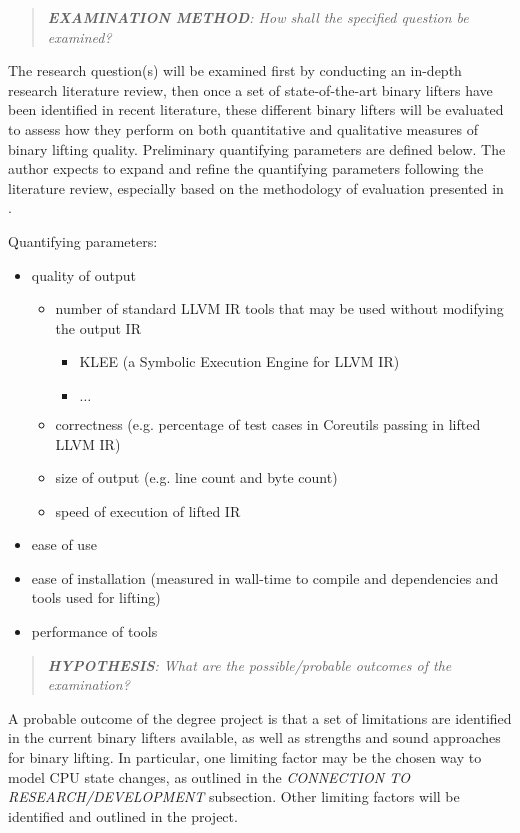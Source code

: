 \documentclass[12pt, a4paper]{article}
\begin{document}

\begin{quote}
	\textit{\textbf{EXAMINATION METHOD}: How shall the specified question be examined?}
\end{quote}

The research question(s) will be examined first by conducting an in-depth research literature review, then once a set of state-of-the-art binary lifters have been identified in recent literature, these different binary lifters will be evaluated to assess how they perform on both quantitative and qualitative measures of binary lifting quality. Preliminary quantifying parameters are defined below. The author expects to expand and refine the quantifying parameters following the literature review, especially based on the methodology of evaluation presented in \cite{evaluation_of_irs}.

Quantifying parameters:
\begin{itemize}
	\item quality of output
	\begin{itemize}
		\item number of standard LLVM IR tools that may be used without modifying the output IR
		\begin{itemize}
			\item KLEE (a Symbolic Execution Engine for LLVM IR)
			\item $\dots$
		\end{itemize}
		\item correctness (e.g. percentage of test cases in Coreutils passing in lifted LLVM IR)
		\item size of output (e.g. line count and byte count)
		\item speed of execution of lifted IR
	\end{itemize}
	\item ease of use
	\item ease of installation (measured in wall-time to compile and dependencies and tools used for lifting)
	\item performance of tools
\end{itemize}

\begin{quote}
	\textit{\textbf{HYPOTHESIS}: What are the possible/probable outcomes of the examination?}
\end{quote}

A probable outcome of the degree project is that a set of limitations are identified in the current binary lifters available, as well as strengths and sound approaches for binary lifting. In particular, one limiting factor may be the chosen way to model CPU state changes, as outlined in the \textit{CONNECTION TO RESEARCH/DEVELOPMENT} subsection. Other limiting factors will be identified and outlined in the project.
\end{document}
